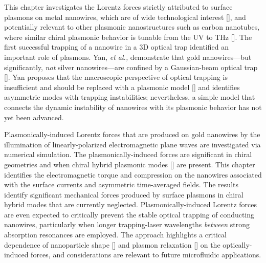 This chapter investigates the Lorentz forces strictly attributed to surface plasmons on metal nanowires, which are of wide technological interest [\cite{Knight2007, Lal2007, Maier2005}], and potentially relevant to other plasmonic nanostructures such as carbon nanotubes, where similar chiral plasmonic behavior is tunable from the UV to THz [\cite{PhysRevBnanotube}]. The first successful trapping of a nanowire in a 3D optical trap identified an important role of plasmons. Yan, {\it et al.,} demonstrate that gold nanowires---but significantly, {\it not} silver nanowires---are confined by a Gaussian-beam optical trap [\cite{Yan2013}].  Yan proposes that the macroscopic perspective of optical trapping is insufficient and should be replaced with a plasmonic model [\cite{Yan2012}] and identifies asymmetric modes with trapping instabilities; nevertheless, a simple model that connects the dynamic instability of nanowires with its plasmonic behavior has not yet been advanced.

Plasmonically-induced Lorentz forces that are produced on gold nanowires by the illumination of linearly-polarized electromagnetic plane waves are investigated via numerical simulation.  The plasmonically-induced forces are significant in chiral geometries and when chiral hybrid plasmonic modes [\cite{Zhang2011}] are present.  This chapter identifies the electromagnetic torque and compression on the nanowires associated with the surface currents and asymmetric time-averaged fields. The results identify significant mechanical forces produced by surface plasmons in chiral hybrid modes that are currently neglected. Plasmonically-induced Lorentz forces are even expected to critically prevent the stable optical trapping of conducting nanowires, particularly when longer trapping-laser wavelengths {\it between} strong absorption resonances are employed. The approach highlights a critical dependence of nanoparticle shape [\cite{Knight2007, Tong}] and plasmon relaxation [\cite{Yan2013}] on the optically-induced forces, and considerations are relevant to future microfluidic applications.

